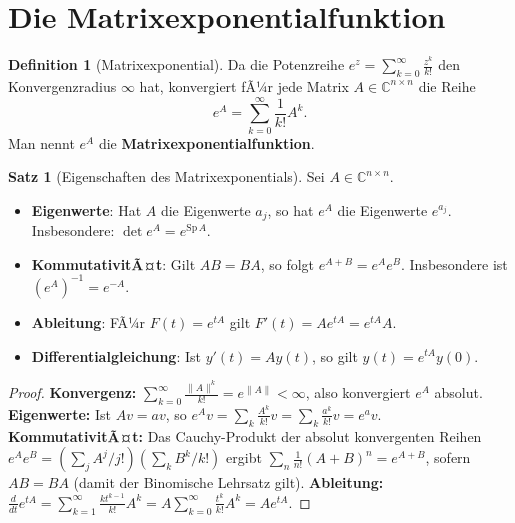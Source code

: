 ﻿\documentclass[a4paper,12pt]{report}
\theoremstyle{definition}
\newtheorem{definition}{Definition}
\newtheorem{satz}{Satz}
\begin{document}
\section{Die Matrixexponentialfunktion}

\begin{definition}[Matrixexponential]
    Da die Potenzreihe $e^z = \sum_{k=0}^\infty \frac{z^k}{k!}$ den
    Konvergenzradius $\infty$ hat, konvergiert fÃ¼r jede Matrix
    $A \in \mathbb{C}^{n \times n}$ die Reihe
    \[
        e^A = \sum_{k=0}^\infty \frac{1}{k!} A^k.
    \]
    Man nennt $e^A$ die \textbf{Matrixexponentialfunktion}.
\end{definition}

\begin{satz}[Eigenschaften des Matrixexponentials]
    Sei $A \in \mathbb{C}^{n \times n}$.
    \begin{itemize}
        \item[-] \textbf{Eigenwerte}: Hat $A$ die Eigenwerte $a_j$, so hat
              $e^A$ die Eigenwerte $e^{a_j}$. Insbesondere:
              $\det e^A = e^{\mathrm{Sp}\, A}$.
        \item[-] \textbf{KommutativitÃ¤t}: Gilt $AB = BA$, so folgt
              $e^{A+B} = e^A e^B$. Insbesondere ist $(e^A)^{-1} = e^{-A}$.
        \item[-] \textbf{Ableitung}: FÃ¼r $F(t) = e^{tA}$ gilt
              $F'(t) = A e^{tA} = e^{tA} A$.
        \item[-] \textbf{Differentialgleichung}: Ist $y'(t) = Ay(t)$,
              so gilt $y(t) = e^{tA} y(0)$.
    \end{itemize}
\end{satz}
\begin{proof}
    \textbf{Konvergenz:} $\sum_{k=0}^\infty \frac{\|A\|^k}{k!} = e^{\|A\|} < \infty$,
    also konvergiert $e^A$ absolut.
    \textbf{Eigenwerte:} Ist $Av = av$, so $e^A v = \sum_k \frac{A^k}{k!} v
    = \sum_k \frac{a^k}{k!} v = e^a v$.
    \textbf{KommutativitÃ¤t:} Das Cauchy-Produkt der absolut konvergenten Reihen
    $e^A e^B = (\sum_j A^j/j!)(\sum_k B^k/k!)$ ergibt $\sum_n \frac{1}{n!}(A+B)^n = e^{A+B}$,
    sofern $AB = BA$ (damit der Binomische Lehrsatz gilt).
    \textbf{Ableitung:} $\frac{d}{dt} e^{tA} = \sum_{k=1}^\infty \frac{k t^{k-1}}{k!} A^k
    = A \sum_{k=0}^\infty \frac{t^k}{k!} A^k = A e^{tA}$.
\end{proof}
\end{document}
